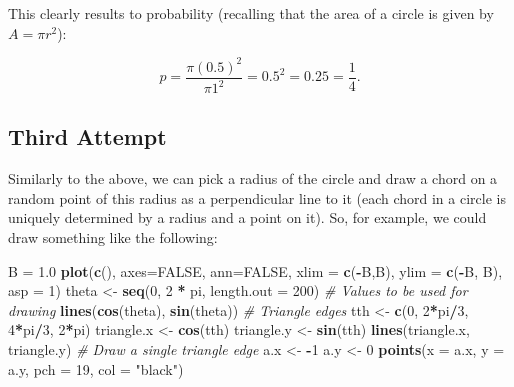 \documentclass[
]{article}
\newenvironment{Shaded}{\begin{snugshade}}{\end{snugshade}}
\newcommand{\AttributeTok}[1]{\textcolor[rgb]{0.13,0.29,0.53}{#1}}
\newcommand{\CommentTok}[1]{\textcolor[rgb]{0.56,0.35,0.01}{\textit{#1}}}
\newcommand{\ConstantTok}[1]{\textcolor[rgb]{0.56,0.35,0.01}{#1}}
\newcommand{\DecValTok}[1]{\textcolor[rgb]{0.00,0.00,0.81}{#1}}
\newcommand{\FloatTok}[1]{\textcolor[rgb]{0.00,0.00,0.81}{#1}}
\newcommand{\FunctionTok}[1]{\textcolor[rgb]{0.13,0.29,0.53}{\textbf{#1}}}
\newcommand{\NormalTok}[1]{#1}
\newcommand{\OtherTok}[1]{\textcolor[rgb]{0.56,0.35,0.01}{#1}}
\newcommand{\SpecialCharTok}[1]{\textcolor[rgb]{0.81,0.36,0.00}{\textbf{#1}}}
\newcommand{\StringTok}[1]{\textcolor[rgb]{0.31,0.60,0.02}{#1}}
\begin{document}
This clearly results to probability (recalling that the area of a circle
is given by \(A=\pi r^2\)):

\[p=\frac{\pi(0.5)^2}{\pi1^2}=0.5^2=0.25=\frac{1}{4}.\]

\subsection{Third Attempt}\label{third-attempt}

Similarly to the above, we can pick a radius of the circle and draw a
chord on a random point of this radius as a perpendicular line to it
(each chord in a circle is uniquely determined by a radius and a point
on it). So, for example, we could draw something like the following:

\begin{Shaded}
\begin{Highlighting}[]
\NormalTok{B }\OtherTok{=} \FloatTok{1.0}
\FunctionTok{plot}\NormalTok{(}\FunctionTok{c}\NormalTok{(), }\AttributeTok{axes=}\ConstantTok{FALSE}\NormalTok{, }\AttributeTok{ann=}\ConstantTok{FALSE}\NormalTok{, }\AttributeTok{xlim =} \FunctionTok{c}\NormalTok{(}\SpecialCharTok{{-}}\NormalTok{B,B), }\AttributeTok{ylim  =} \FunctionTok{c}\NormalTok{(}\SpecialCharTok{{-}}\NormalTok{B, B), }\AttributeTok{asp =} \DecValTok{1}\NormalTok{)}
\NormalTok{theta }\OtherTok{\textless{}{-}} \FunctionTok{seq}\NormalTok{(}\DecValTok{0}\NormalTok{, }\DecValTok{2} \SpecialCharTok{*}\NormalTok{ pi, }\AttributeTok{length.out =} \DecValTok{200}\NormalTok{) }\CommentTok{\# Values to be used for drawing}
\FunctionTok{lines}\NormalTok{(}\FunctionTok{cos}\NormalTok{(theta), }\FunctionTok{sin}\NormalTok{(theta))}
\CommentTok{\# Triangle edges}
\NormalTok{tth }\OtherTok{\textless{}{-}} \FunctionTok{c}\NormalTok{(}\DecValTok{0}\NormalTok{, }\DecValTok{2}\SpecialCharTok{*}\NormalTok{pi}\SpecialCharTok{/}\DecValTok{3}\NormalTok{, }\DecValTok{4}\SpecialCharTok{*}\NormalTok{pi}\SpecialCharTok{/}\DecValTok{3}\NormalTok{, }\DecValTok{2}\SpecialCharTok{*}\NormalTok{pi)}
\NormalTok{triangle.x }\OtherTok{\textless{}{-}} \FunctionTok{cos}\NormalTok{(tth)}
\NormalTok{triangle.y }\OtherTok{\textless{}{-}} \FunctionTok{sin}\NormalTok{(tth)}
\FunctionTok{lines}\NormalTok{(triangle.x, triangle.y)}
\CommentTok{\# Draw a single triangle edge}
\NormalTok{a.x }\OtherTok{\textless{}{-}} \SpecialCharTok{{-}}\DecValTok{1}
\NormalTok{a.y }\OtherTok{\textless{}{-}} \DecValTok{0}
\FunctionTok{points}\NormalTok{(}\AttributeTok{x =}\NormalTok{ a.x, }\AttributeTok{y =}\NormalTok{ a.y, }\AttributeTok{pch =} \DecValTok{19}\NormalTok{, }\AttributeTok{col =} \StringTok{"black"}\NormalTok{)}

\end{Highlighting}
\end{Shaded}
\end{document}
